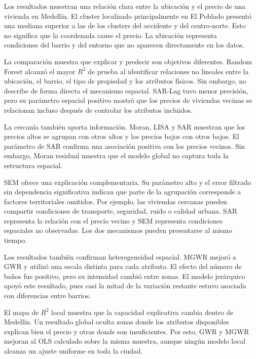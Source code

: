 \documentclass[conference]{IEEEtran}
\begin{document}
Los resultados muestran una relación clara entre la ubicación y el precio de una vivienda en Medellín. El cluster localizado principalmente en El Poblado presentó una mediana superior a las de los clusters del occidente y del centro-norte. Esto no significa que la coordenada cause el precio. La ubicación representa condiciones del barrio y del entorno que no aparecen directamente en los datos.

La comparación muestra que explicar y predecir son objetivos diferentes. Random Forest alcanzó el mayor $R^2$ de prueba al identificar relaciones no lineales entre la ubicación, el barrio, el tipo de propiedad y los atributos físicos. Sin embargo, no describe de forma directa el mecanismo espacial. SAR-Lag tuvo menor precisión, pero su parámetro espacial positivo mostró que los precios de viviendas vecinas se relacionan incluso después de controlar los atributos incluidos.

La cercanía también aporta información. Moran, LISA y SAR muestran que los precios altos se agrupan con otros altos y los precios bajos con otros bajos. El parámetro de SAR confirma una asociación positiva con los precios vecinos. Sin embargo, Moran residual muestra que el modelo global no captura toda la estructura espacial.

SEM ofrece una explicación complementaria. Su parámetro alto y el error filtrado sin dependencia significativa indican que parte de la agrupación corresponde a factores territoriales omitidos. Por ejemplo, las viviendas cercanas pueden compartir condiciones de transporte, seguridad, ruido o calidad urbana. SAR representa la relación con el precio vecino y SEM representa condiciones espaciales no observadas. Los dos mecanismos pueden presentarse al mismo tiempo.

Los resultados también confirman heterogeneidad espacial. MGWR mejoró a GWR y utilizó una escala distinta para cada atributo. El efecto del número de baños fue positivo, pero su intensidad cambió entre zonas. El modelo jerárquico apoyó este resultado, pues casi la mitad de la variación restante estuvo asociada con diferencias entre barrios.

El mapa de $R^2$ local muestra que la capacidad explicativa cambia dentro de Medellín. Un resultado global oculta zonas donde los atributos disponibles explican bien el precio y otras donde son insuficientes. Por esto, GWR y MGWR mejoran al OLS calculado sobre la misma muestra, aunque ningún modelo local alcanza un ajuste uniforme en toda la ciudad.
\end{document}
